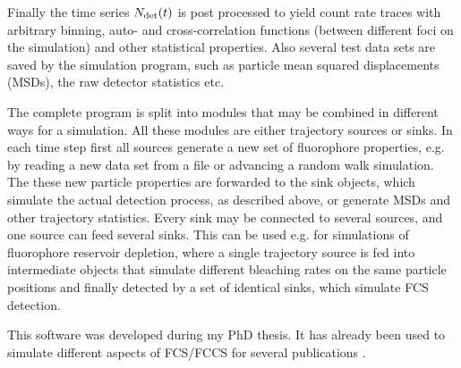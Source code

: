 Finally the time series  ${N}_{\text{det}}(t)$ is post processed to yield count rate traces with arbitrary binning, auto- and cross-correlation functions (between different foci on the simulation) and other statistical properties. Also several test data sets are saved by the simulation program, such as particle mean squared displacements (MSDs), the raw detector statistics etc.

The complete program is split into modules that may be combined in different ways for a simulation. All these modules are either trajectory sources or sinks. In each time step first all sources generate a new set of fluorophore properties, e.g. by reading a new data set from a file or advancing a random walk simulation. The these new particle properties are forwarded to the sink objects, which simulate the actual detection process, as described above, or generate MSDs and other trajectory statistics. Every sink may be connected to several sources, and one source can feed several sinks. This can be used e.g. for simulations of fluorophore reservoir depletion, where a single trajectory source is fed into intermediate objects that simulate different bleaching rates on the same particle positions and finally detected by a set of identical sinks, which simulate FCS detection.

This software was developed during my PhD thesis. It has already been used to simulate different aspects of FCS/FCCS for several publications \cite{WOCJAN2009,BUCHHO2012,SINGHKRIEGER2013,KRIEGE2014}.



